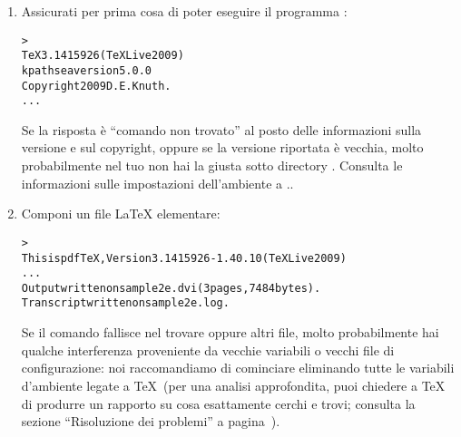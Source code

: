 \documentclass{article}
\begin{document}
\begin{enumerate}

\item Assicurati per prima cosa di poter eseguire il programma
:
\begin{alltt}
> 
TeX 3.1415926 (TeX Live 2009)
kpathsea version 5.0.0
Copyright 2009 D.E. Knuth.
...
\end{alltt}
Se la risposta è ``comando non trovato'' al posto delle informazioni sulla
versione e sul copyright, oppure se la versione riportata è vecchia, molto
probabilmente nel tuo  non hai la giusta sotto directory
. Consulta le informazioni sulle impostazioni dell'ambiente a
\p.\pageref{sec:env}.

\item Componi un file \LaTeX{} elementare:
\begin{alltt}
> 
This is pdfTeX, Version 3.1415926-1.40.10 (TeX Live 2009)
...
Output written on sample2e.dvi (3 pages, 7484 bytes).
Transcript written on sample2e.log.
\end{alltt}
Se il comando fallisce nel trovare  oppure altri
file, molto probabilmente hai qualche interferenza proveniente da vecchie
variabili o vecchi file di configurazione: noi raccomandiamo di cominciare
eliminando tutte le variabili d'ambiente legate a \TeX\ (per una analisi
approfondita, puoi chiedere a \TeX{} di produrre un rapporto su cosa
esattamente cerchi e trovi; consulta la sezione ``Risoluzione dei
problemi'' a pagina~\pageref{sec:debugging}).


\end{enumerate}
\end{document}
